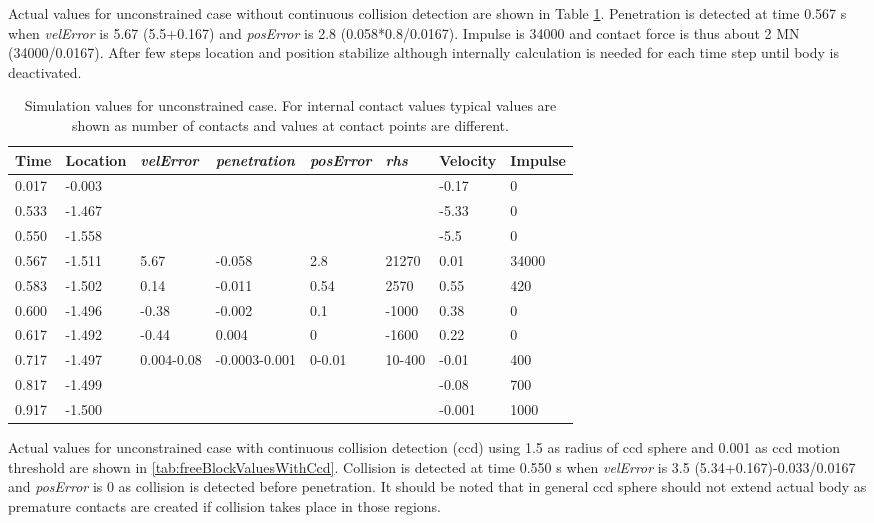 Actual values for unconstrained case without continuous collision detection
are shown in Table \ref{tab:freeBlockValues}. Penetration is detected at time 0.567 s when
{\it velError} is 5.67 (5.5+0.167) and
{\it posError} is 2.8 (0.058*0.8/0.0167). Impulse is 34000 and contact force is thus about 2 MN (34000/0.0167).
After few steps location and position stabilize although internally calculation is needed for each time step
until body is deactivated.

\begin {table}[htb!]
\caption {Simulation values for unconstrained case. 
For internal contact values typical values are shown
as number of contacts and values at contact points are different.} 
\label{tab:freeBlockValues} 
\begin{center}
\begin{tabular}{|l| l|l| l|l|l|l|l|}
\hline
{\bf Time} & 
{\bf Location} &
{\it velError} & {\it penetration} & {\it posError} & {\it rhs} &
{\bf Velocity} & 
{\bf Impulse} \\  \hline
0.017 &  -0.003 & & & &  &-0.17 & 0 \\  \hline
0.533 &  -1.467 & & & & & -5.33 & 0 \\  \hline
0.550 &  -1.558 & & & & & -5.5 & 0 \\  \hline
0.567 &  -1.511 & 5.67 &-0.058 &2.8 &  21270 & 0.01 & 34000 \\  \hline
0.583 &  -1.502 & 0.14 &-0.011 & 0.54& 2570  & 0.55 & 420 \\  \hline
0.600 &  -1.496 & -0.38&-0.002 & 0.1  & -1000& 0.38 & 0 \\  \hline
0.617 &  -1.492 &-0.44 & 0.004 & 0     & -1600& 0.22 & 0 \\  \hline
0.717 &  -1.497 &0.004-0.08  &-0.0003-0.001 &0-0.01 & 10-400 & -0.01 & 400 \\  \hline
0.817 &  -1.499 & & & & & -0.08 & 700 \\  \hline
0.917 &  -1.500 & & & & & -0.001 & 1000 \\  \hline
\end {tabular}
\end{center}
\end {table}



Actual values for unconstrained case with continuous collision detection (ccd) using 1.5 
as radius of ccd sphere and 0.001 as ccd motion threshold
are shown in \ref{tab:freeBlockValuesWithCcd}. Collision is detected at time 0.550 s when
{\it velError} is  3.5 (5.34+0.167)-0.033/0.0167 and
{\it posError} is  0 as collision is detected before penetration. 
It should be noted that in general ccd sphere should not extend actual body as 
premature contacts are created if collision takes place in those regions.

